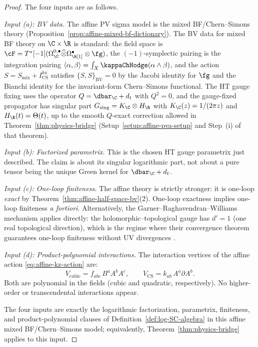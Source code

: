 \begin{proof}
The four inputs are as follows.

\smallskip\noindent
\emph{Input \textup{(a)}: BV data.}
The affine PV sigma model is the mixed BF/Chern--Simons theory
(Proposition~\ref{prop:affine-mixed-bf-dictionary}). The BV data for
mixed BF theory on $\C \times \R$ is standard: the field space is
$\cF = T^*[-1](\Omega^{0,\bullet}_\C \widehat\otimes
\Omega^\bullet_\R[1] \otimes \fg)$, the $(-1)$-symplectic pairing is
the integration pairing $\langle \alpha, \beta \rangle = \int_X
\kappaChHodge(\alpha \wedge \beta)$, and the action $S = S_{\mathrm{mix}} +
I_{\mathrm{CS}}^{k\kappa}$ satisfies $\{S, S\}_{\mathrm{BV}} = 0$ by the
Jacobi identity for $\fg$ and the Bianchi identity for the invariant-form
Chern--Simons functional.
The HT gauge fixing uses the operator
$Q = \dbar_\C + d_t$ with $Q^2 = 0$, and the gauge-fixed propagator
has singular part $G_{\mathrm{sing}} = K_\C \otimes H_\R$ with
$K_\C(z) = 1/(2\pi z)$ and $H_\R(t) = \Theta(t)$, up to the smooth
$Q$-exact correction allowed in Theorem~\ref{thm:physics-bridge}
(Setup~\ref{setup:affine-pva-setup} and Step~(i) of that theorem).

\smallskip\noindent
\emph{Input \textup{(b)}: Factorized parametrix.}
This is the chosen HT gauge parametrix just described. The claim is
about its singular logarithmic part, not about a pure tensor being the
unique Green kernel for $\dbar_\C+d_t$.

\smallskip\noindent
\emph{Input \textup{(c)}: One-loop finiteness.}
The affine theory is strictly stronger: it is one-loop
\emph{exact} by Theorem~\ref{thm:affine-half-space-bv}\textup{(2)}.
One-loop exactness implies one-loop finiteness \emph{a fortiori}.
Alternatively, the Garner--Raghavendran--Williams mechanism applies
directly: the holomorphic--topological gauge has $d' = 1$ (one real
topological direction), which is the regime where their convergence
theorem guarantees one-loop finiteness without UV divergences
\cite{GRW21}.

\smallskip\noindent
\emph{Input \textup{(d)}: Product-polynomial interactions.}
The interaction vertices of the affine action
\eqref{eq:affine-kz-action} are:
\[
V_{\mathrm{cubic}} = f_{abc}\,B^a A^b A^c,
\qquad
V_{\mathrm{CS}} = k_{ab}\,A^a \partial A^b.
\]
Both are polynomial in the fields (cubic and quadratic,
respectively). No higher-order or transcendental interactions
appear.

\smallskip
The four inputs are exactly the logarithmic
factorization, parametrix, finiteness, and product-polynomial clauses
of Definition~\ref{def:log-SC-algebra} in this affine mixed
BF/Chern--Simons model; equivalently, Theorem~\ref{thm:physics-bridge}
applies to this input.
\end{proof}

